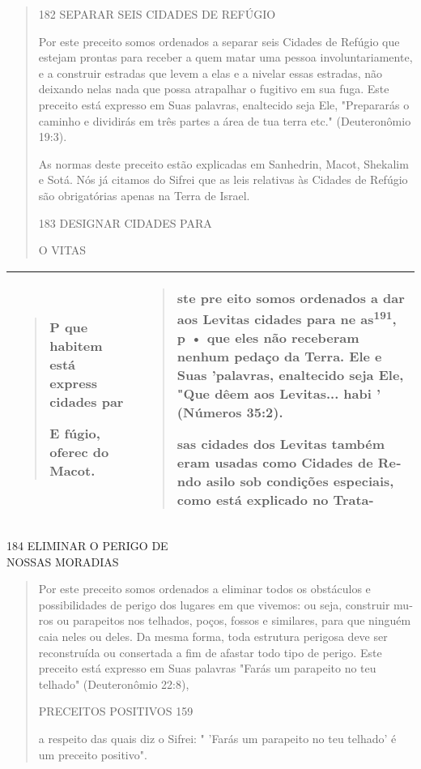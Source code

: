 \begin{quote}
182 SEPARAR SEIS CIDADES DE REFÚGIO

Por este preceito somos ordenados a separar seis Cidades de Refú­gio que
estejam prontas para receber a quem matar uma pessoa involuntaria­mente,
e a construir estradas que levem a elas e a nivelar essas estradas, não
deixando nelas nada que possa atrapalhar o fugitivo em sua fuga. Este
preceito está expresso em Suas palavras, enaltecido seja Ele,
"Prepararás o caminho e dividirás em três partes a área de tua terra
etc." (Deuteronômio 19:3).

As normas deste preceito estão explicadas em Sanhedrin, Macot, She­kalim
e Sotá. Nós já citamos do Sifrei que as leis relativas às Cidades de
Refúgio são obrigatórias apenas na Terra de Israel.

183 DESIGNAR CIDADES PARA

O VITAS
\end{quote}

\begin{longtable}[]{@{}ll@{}}
\toprule
\endhead
\begin{minipage}[t]{0.47\columnwidth}\raggedright
\begin{quote}
P que habitem está express cidades par

E fúgio, oferec do Macot.
\end{quote}\strut
\end{minipage} & \begin{minipage}[t]{0.47\columnwidth}\raggedright
\begin{quote}
ste pre eito somos ordenados a dar aos Levitas cidades para ne
as\textsuperscript{191}, p • que eles não receberam nenhum pedaço da
Terra. Ele e Suas 'palavras, enaltecido seja Ele, "Que dêem aos
Levitas... habi ' (Números 35:2).

sas cidades dos Levitas também eram usadas como Cidades de Re­ndo asilo
sob condições especiais, como está explicado no Trata-
\end{quote}\strut
\end{minipage}\tabularnewline
\bottomrule
\end{longtable}

184 ELIMINAR O PERIGO DE\\
NOSSAS MORADIAS

\begin{quote}
Por este preceito somos ordenados a eliminar todos os obstáculos e
possibilidades de perigo dos lugares em que vivemos: ou seja, construir
mu­ros ou parapeitos nos telhados, poços, fossos e similares, para que
ninguém caia neles ou deles. Da mesma forma, toda estrutura perigosa
deve ser reconstruída ou consertada a fim de afastar todo tipo de
perigo. Este preceito está expresso em Suas palavras "Farás um parapeito
no teu telhado" (Deuteronômio 22:8),

PRECEITOS POSITIVOS 159

a respeito das quais diz o Sifrei: " 'Farás um parapeito no teu telhado'
é um preceito positivo".
\end{quote}

